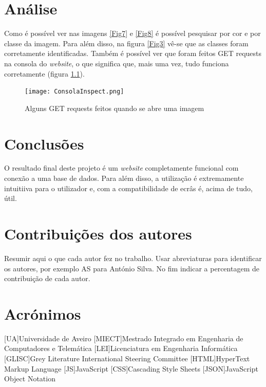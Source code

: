 \documentclass{report}
\begin{document}
\chapter{Análise}
\label{chap.analise}
Como é possível ver nas imagens \ref{Fig7} e \ref{Fig8} é possível pesquisar por cor e por classe da imagem. Para além disso, na figura \ref{Fig3} vê-se que as classes foram corretamente identificadas. Também é possível ver que foram feitos GET requests na consola do \textit{website}, o que significa que, mais uma vez, tudo funciona corretamente (figura \ref{Fig10}).

\begin{figure}[H]
\texttt{[image: ConsolaInspect.png]}
\caption{Alguns GET requests feitos quando se abre uma imagem}
\label{Fig10}
\end{figure}

\chapter{Conclusões}
\label{chap.conclusao}
O resultado final deste projeto é um \textit{website} completamente funcional com conexão a uma base de dados. Para além disso, a utilização é extremamente intuitiiva para o utilizador e, com a compatibilidade de ecrâs é, acima de tudo, útil.

\chapter*{Contribuições dos autores}
Resumir aqui o que cada autor fez no trabalho.
Usar abreviaturas para identificar os autores,
por exemplo AS para António Silva.
No fim indicar a percentagem de contribuição de cada autor.

\chapter*{Acrónimos}
\begin{acronym}
[UA]{Universidade de Aveiro}
[MIECT]{Mestrado Integrado em Engenharia de Computadores e Telemática}
[LEI]{Licenciatura em Engenharia Informática}
[GLISC]{Grey Literature International Steering Committee}
[HTML]{HyperText Markup Language}
[JS]{JavaScript}
[CSS]{Cascading Style Sheets}
[JSON]{JavaScript Object Notation}
\end{acronym}


\printbibliography
\end{document}

